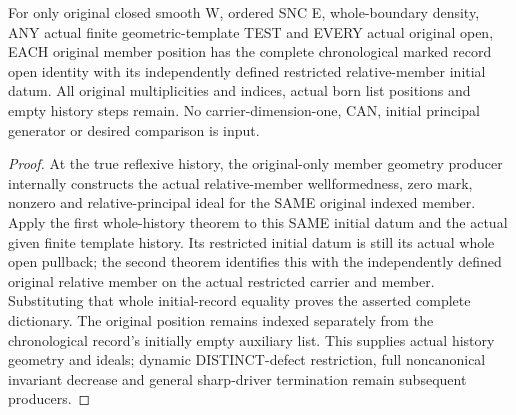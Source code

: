 \begin{theorem}
\label{hir:sharp-original-members-whole-chronological-open-naturality}
\leanok
For only original closed smooth W, ordered SNC E, whole-boundary density,
ANY actual finite geometric-template TEST and EVERY actual original open,
EACH original member position has the complete chronological marked record
open identity with its independently defined restricted relative-member
initial datum. All original multiplicities and indices, actual born list
positions and empty history steps remain. No carrier-dimension-one, CAN,
initial principal generator or desired comparison is input.
\end{theorem}
\begin{proof}
At the true reflexive history, the original-only member geometry producer
internally constructs the actual relative-member wellformedness, zero mark,
nonzero and relative-principal ideal for the SAME original indexed member.
Apply the first whole-history theorem to this SAME initial datum and the
actual given finite template history. Its restricted initial datum is still
its actual whole open pullback; the second theorem identifies this with the
independently defined original relative member on the actual restricted
carrier and member. Substituting that whole initial-record equality proves
the asserted complete dictionary. The original position remains indexed
separately from the chronological record's initially empty auxiliary list.
This supplies actual history geometry and ideals; dynamic DISTINCT-defect
restriction, full noncanonical invariant decrease and general sharp-driver
termination remain subsequent producers.
\end{proof}
